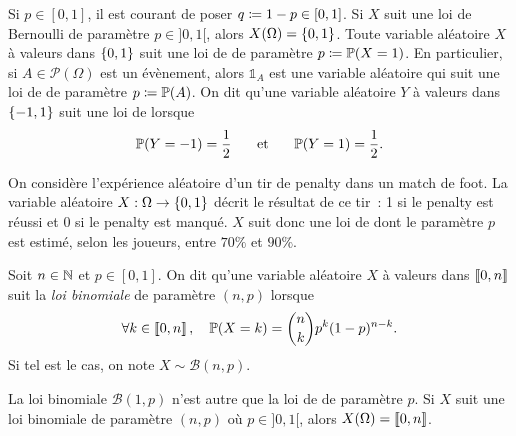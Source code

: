 \documentclass{magnolia}
\begin{document}
\begin{remarques}
\remarque Si $p\in[0,1]$, il est courant de poser $q\coloneqq 1-p\in[0,1]$.
\remarque Si $X$ suit une loi de Bernoulli de paramètre $p\in]0,1[$, alors $X(\Omega)=\left\{0,1\right\}$.
\remarque Toute variable aléatoire $X$ à valeurs dans $\left\{0,1\right\}$ suit une loi de 
  de paramètre $p\coloneqq\mathbb{P}(X=1)$. En particulier, si $A\in\mathcal{P}(\Omega)$ est un évènement,
  alors $\mathds{1}_A$ est une variable aléatoire qui suit une
  loi de  de paramètre $p\coloneqq\mathbb{P}(A)$.
\remarque On dit qu'une variable aléatoire $Y$ à valeurs dans $\left\{-1,1\right\}$ suit une loi de
   lorsque
  \[\mathbb{P}(Y=-1)=\frac{1}{2} \quad\quad\!\text{et}\quad\!\quad \mathbb{P}(Y=1)=\frac{1}{2}.\]
\end{remarques}

\begin{exempleUnique}
\exemple On considère l'expérience aléatoire d'un tir de penalty dans un match de foot. 
  La variable aléatoire $X:\Omega\to\left\{0,1\right\}$ décrit le résultat de ce tir~: 1 si le
  penalty est réussi et 0 si le penalty est manqué. $X$ suit donc une loi de
   dont le paramètre $p$ est estimé, selon les joueurs, entre $70\%$ et $90\%$.
\end{exempleUnique}

\begin{definition}[nom={Loi binomiale}]
Soit $n\in\mathbb{N}$ et $p\in[0,1]$. On dit qu'une variable aléatoire $X$ à valeurs dans $\left\llbracket 0,n\right\rrbracket$
suit la \emph{loi binomiale} de paramètre $(n,p)$ lorsque
\[\forall k\in\left\llbracket 0,n\right\rrbracket,\quad \mathbb{P}(X=k)=\binom{n}{k}p^k(1-p)^{n-k}.\]
Si tel est le cas, on note $X\sim\mathcal{B}(n,p)$. 
\end{definition}

\begin{remarques}
\remarque La loi binomiale $\mathcal{B}(1,p)$ n'est autre
  que la loi de  de paramètre $p$.
\remarque Si $X$ suit une loi binomiale de paramètre $(n,p)$ où $p\in]0,1[$, alors $X(\Omega)=\left\llbracket 0,n\right\rrbracket$.
\end{remarques}
\end{document}
